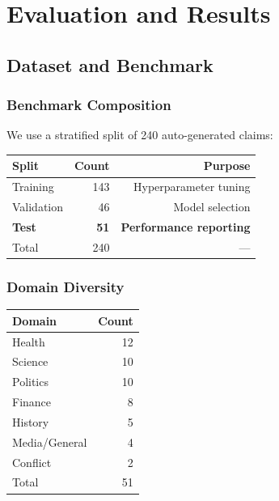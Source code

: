 \documentclass[12pt,a4paper,twoside]{article}
\begin{document}
\section{Evaluation and Results}

\subsection{Dataset and Benchmark}

\subsubsection{Benchmark Composition}

We use a stratified split of 240 auto-generated claims:

\begin{table}[H]
    \centering
    \begin{tabular}{|l|r|r|}
        \hline
        \textbf{Split} & \textbf{Count} & \textbf{Purpose} \\
        \hline
        Training & 143 & Hyperparameter tuning \\
        Validation & 46 & Model selection \\
        \textbf{Test} & \textbf{51} & \textbf{Performance reporting} \\
        \hline
        Total & 240 & --- \\
        \hline
    \end{tabular}
\end{table}

\subsubsection{Domain Diversity}

\begin{table}[H]
    \centering
    \begin{tabular}{|l|r|}
        \hline
        \textbf{Domain} & \textbf{Count} \\
        \hline
        Health & 12 \\
        Science & 10 \\
        Politics & 10 \\
        Finance & 8 \\
        History & 5 \\
        Media/General & 4 \\
        Conflict & 2 \\
        \hline
        Total & 51 \\
        \hline
    \end{tabular}
\end{table}
\end{document}

